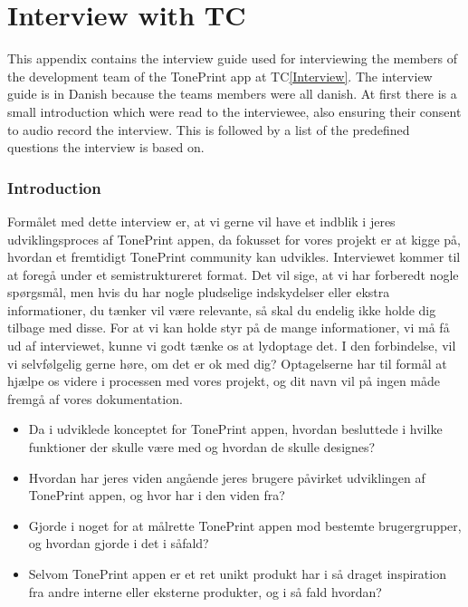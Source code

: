 \chapter{Interview with TC}
\label{AppendixInterviewGuide}
%
This appendix contains the interview guide used for interviewing the members of the development team of the TonePrint app at TC\autoref{Interview}. The interview guide is in Danish because the teams members were all danish. At first there is a small introduction which were read to the interviewee, also ensuring their consent to audio record the interview. This is followed by a list of the predefined questions the interview is based on. 
%
\subsection*{Introduction}
\label{App:InterviewIntroduction}
Formålet med dette interview er, at vi gerne vil have et indblik i jeres udviklingsproces af TonePrint appen, da fokusset for vores projekt er at kigge på, hvordan et fremtidigt TonePrint community kan udvikles. Interviewet kommer til at foregå under et semistruktureret format. Det vil sige, at vi har forberedt nogle spørgsmål, men hvis du har nogle pludselige indskydelser eller ekstra informationer, du tænker vil være relevante, så skal du endelig ikke holde dig tilbage med disse. For at vi kan holde styr på de mange informationer, vi må få ud af interviewet, kunne vi godt tænke os at lydoptage det. I den forbindelse, vil vi selvfølgelig gerne høre, om det er ok med dig? Optagelserne har til formål at hjælpe os videre i processen med vores projekt, og dit navn vil på ingen måde fremgå af vores dokumentation.

\begin{itemize}
  \item Da i udviklede konceptet for TonePrint appen, hvordan besluttede i hvilke funktioner der skulle være med og hvordan de skulle designes?\\
  \item Hvordan har jeres viden angående jeres brugere påvirket udviklingen af TonePrint appen, og hvor har i den viden fra?\\
  \item Gjorde i noget for at målrette TonePrint appen mod bestemte brugergrupper, og hvordan gjorde i det i såfald?\\
  \item Selvom TonePrint appen er et ret unikt produkt har i så draget inspiration fra andre interne eller eksterne produkter, og i så fald hvordan?\\
\end{itemize}


